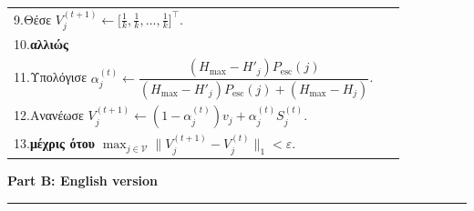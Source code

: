 \documentclass[11pt, a4paper]{article}
\theoremstyle{definition}
\theoremstyle{definition}
\begin{document}
\begin{table}[!htbp]
{\begin{tabular}{p{0.95\linewidth}}
9.\quad\quad\quad Θέσε $V_j^{(t+1)} \leftarrow \big[\frac{1}{k}, \frac{1}{k}, \dots, \frac{1}{k}\big]^\top$.\\
10.\quad\quad \textbf{αλλιώς}\\
11.\quad\quad\quad Υπολόγισε $\alpha_j^{(t)} \leftarrow \dfrac{(H_{\max} - H'_j)P_{\mathrm{esc}}(j)}{(H_{\max} - H'_j)P_{\mathrm{esc}}(j) + (H_{\max} - H_j)}$.\\
12.\quad\quad\quad Ανανέωσε $V_j^{(t+1)} \leftarrow \left(1 - \alpha_j^{(t)}\right)v_j + \alpha_j^{(t)} S_j^{(t)}$.\\
13.\quad \textbf{μέχρις ότου} $\max_{j \in \mathcal{V}} \|V_j^{(t+1)} - V_j^{(t)}\|_1 < \varepsilon$.\\
\bottomrule
\end{tabular}}
\end{table}

\newpage
\setcounter{section}{0}
\setcounter{equation}{0}
\setcounter{table}{0}

\begin{center}
\Large \textbf{Part B: English version}
\end{center}
\vspace{4pt}
\hrule
\vspace{8pt}

\begin{abstract}
\noindent We formulate a parameter-free, self-consistent mathematical and algorithmic framework for multi-class node classification in undirected stochastic graphs across $k$ classes $\{A_0, A_1, \dots, A_{k-1}\}$. Our framework unifies three fundamental aspects of graph belief propagation: (i)~an initial trust-calibration stage that discounts uncertain edge probabilities and node prior distributions via the exponential reliability factor $1 - e^{-T}$, redistributing residual prior mass uniformly across the $k$ classes according to the Maximum Entropy Principle; (ii)~a boolean edge-polarity mechanism ($h_{ij} \in \{0,1\}$) that handles both homophilic and heterophilic links through a normalized simplex complement transformation; and (iii)~an endogenous, per-node and per-iteration PageRank damping factor $\alpha_j^{(t)}$ derived from Shannon entropy and the node escape probability $P_{\mathrm{esc}}(j)$. We prove that the proposed damping law $\alpha_j^{(t)} = \frac{(H_{\max} - H')P_{\mathrm{esc}}(j)}{(H_{\max} - H')P_{\mathrm{esc}}(j) + (H_{\max} - H)}$—where $H$ is the Shannon entropy of node $j$'s prior distribution $v_j$ (the multi-class counterpart of the seed vector $x$) and $H'$ is the entropy of its aggregated incoming neighborhood distribution $S_j^{(t)} = \sum_{i \in N(j)} w_{ij}\tilde{V}_i^{(j,t)}$—equals the Kullback--Leibler information odds ratio relative to uniform ignorance, is invariant to the choice of logarithm base ($\log_2$ vs.\ $\ln$), and satisfies all boundary conditions of complete ignorance and certainty.
\end{abstract}
\end{document}
